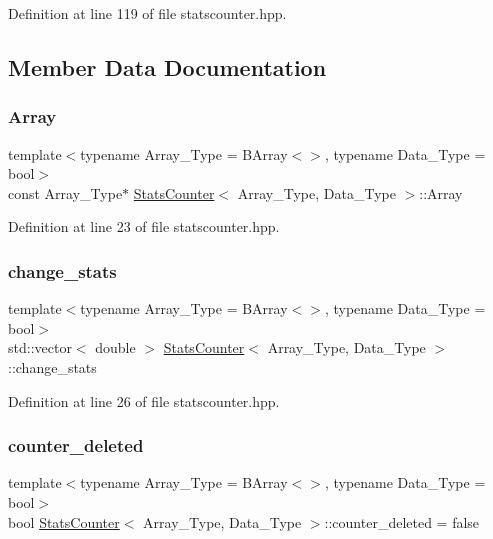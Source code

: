 Definition at line 119 of file statscounter.\+hpp.



\subsection{Member Data Documentation}
\mbox{\label{class_stats_counter_aa826cd748cd3b1a57cbec52424285485}} 
\subsubsection{\texorpdfstring{Array}{Array}}
{\footnotesize\ttfamily template$<$typename Array\+\_\+\+Type = B\+Array$<$$>$, typename Data\+\_\+\+Type = bool$>$ \\
const Array\+\_\+\+Type$\ast$ \hyperlink{class_stats_counter}{Stats\+Counter}$<$ Array\+\_\+\+Type, Data\+\_\+\+Type $>$\+::Array}



Definition at line 23 of file statscounter.\+hpp.

\mbox{\label{class_stats_counter_a42c926799d8cb0abc6f5a1cfbc073f69}} 
\subsubsection{\texorpdfstring{change\+\_\+stats}{change\_stats}}
{\footnotesize\ttfamily template$<$typename Array\+\_\+\+Type = B\+Array$<$$>$, typename Data\+\_\+\+Type = bool$>$ \\
std\+::vector$<$ double $>$ \hyperlink{class_stats_counter}{Stats\+Counter}$<$ Array\+\_\+\+Type, Data\+\_\+\+Type $>$\+::change\+\_\+stats}



Definition at line 26 of file statscounter.\+hpp.

\mbox{\label{class_stats_counter_a9306fc44d8b02a953da4237f8950a53a}} 
\subsubsection{\texorpdfstring{counter\+\_\+deleted}{counter\_deleted}}
{\footnotesize\ttfamily template$<$typename Array\+\_\+\+Type = B\+Array$<$$>$, typename Data\+\_\+\+Type = bool$>$ \\
bool \hyperlink{class_stats_counter}{Stats\+Counter}$<$ Array\+\_\+\+Type, Data\+\_\+\+Type $>$\+::counter\+\_\+deleted = false}



